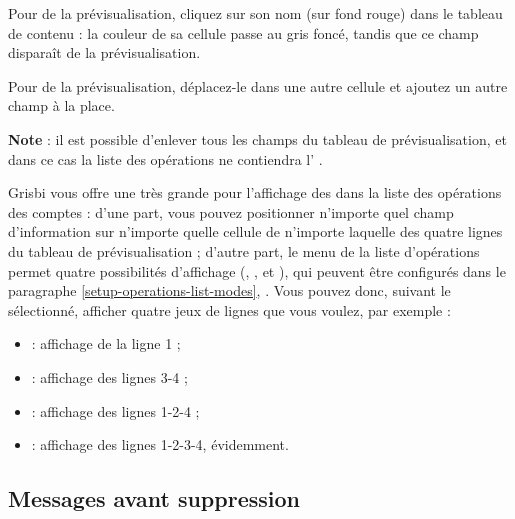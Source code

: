 Pour  de la  prévisualisation, cliquez sur son nom (sur fond rouge{\couleur}) dans le tableau de contenu : la couleur de sa cellule passe au gris foncé{\couleur}, tandis que ce champ disparaît de la prévisualisation.

\ifIllustration
\fi

Pour  de la  prévisualisation, déplacez-le dans une autre cellule et ajoutez un autre champ à la place.

\textbf{Note} : il est possible d'enlever tous les champs du tableau de prévisualisation, et dans ce cas la liste des opérations ne contiendra l' .

Grisbi vous offre une très grande  pour l'affichage des  dans la liste des opérations des comptes : d'une part, vous pouvez positionner n'importe quel champ d'information sur n'importe quelle cellule de n'importe laquelle des quatre lignes du tableau de prévisualisation ; d'autre part, le menu  de la liste d'opérations permet quatre possibilités d'affichage (, ,  et ), qui peuvent être configurés dans le paragraphe  \vref{setup-operations-list-modes}, . Vous pouvez donc, suivant le  sélectionné, afficher quatre jeux de lignes que vous voulez, par exemple :
\begin{itemize}
	\item {} : affichage de la ligne 1 ;
	\item {} : affichage des lignes 3-4 ;
	\item {} : affichage des lignes 1-2-4 ;
	\item {} : affichage des lignes 1-2-3-4, évidemment.
\end{itemize}


\subsection{Messages avant suppression\label{setup-operations-remove}}

